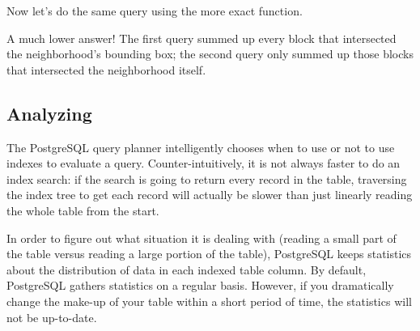 \documentclass[a4paper,11pt,english]{sphinxmanual}
\begin{document}
\begin{sphinxVerbatim}[commandchars=\\\{\}]
\end{sphinxVerbatim}

Now let’s do the same query using the more exact  function.

\begin{sphinxVerbatim}[commandchars=\\\{\}]
 
  
  
  
   
\end{sphinxVerbatim}

\begin{sphinxVerbatim}[commandchars=\\\{\}]
\end{sphinxVerbatim}

A much lower answer! The first query summed up every block that intersected the neighborhood’s bounding box; the second query only summed up those blocks that intersected the neighborhood itself.


\subsection{Analyzing}
\label{\detokenize{basic:analyzing}}
The PostgreSQL query planner intelligently chooses when to use or not to use indexes to evaluate a query. Counter-intuitively, it is not always faster to do an index search: if the search is going to return every record in the table, traversing the index tree to get each record will actually be slower than just linearly reading the whole table from the start.

In order to figure out what situation it is dealing with (reading a small part of the table versus reading a large portion of the table), PostgreSQL keeps statistics about the distribution of data in each indexed table column.  By default, PostgreSQL gathers statistics on a regular basis. However, if you dramatically change the make-up of your table within a short period of time, the statistics will not be up-to-date.
\end{document}
